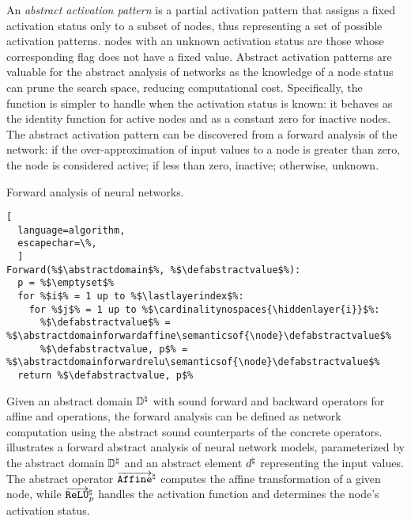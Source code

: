 An \emph{abstract activation pattern} is a partial activation pattern that assigns a fixed activation status only to a subset of \relu{} nodes, thus representing a set of possible activation patterns. \relu{} nodes with an unknown activation status are those whose corresponding flag does not have a fixed value. Abstract activation patterns are valuable for the abstract analysis of networks as the knowledge of a node status can prune the search space, reducing computational cost. Specifically, the \relu{} function is simpler to handle when the activation status is known: it behaves as the identity function for active nodes and as a constant zero for inactive nodes. The abstract activation pattern can be discovered from a forward analysis of the network: if the over-approximation of input values to a node is greater than zero, the node is considered active; if less than zero, inactive; otherwise, unknown.


\begin{marginlisting}
  \caption{Forward analysis of neural networks.}
\vspace{0.8cm}
\begin{lstlisting}[
  language=algorithm,
  escapechar=\%,
  ]
Forward(%$\abstractdomain$%, %$\defabstractvalue$%):
  p = %$\emptyset$%
  for %$i$% = 1 up to %$\lastlayerindex$%:
    for %$j$% = 1 up to %$\cardinalitynospaces{\hiddenlayer{i}}$%:
      %$\defabstractvalue$% = %$\abstractdomainforwardaffine\semanticsof{\node}\defabstractvalue$%
      %$\defabstractvalue, p$% = %$\abstractdomainforwardrelu\semanticsof{\node}\defabstractvalue$%
  return %$\defabstractvalue, p$%
\end{lstlisting}
\end{marginlisting}


Given an abstract domain $\mathbb{D}^\natural$ with sound forward and backward operators for affine and \relu{} operations, the forward analysis can be defined as network computation using the abstract sound counterparts of the concrete operators.  illustrates a forward abstract analysis of neural network models, parameterized by the abstract domain $\mathbb{D}^\natural$ and an abstract element $d^\natural$ representing the input values. The abstract operator $\overrightarrow{\textup{\texttt{Affine}}}^\natural$ computes the affine transformation of a given node, while $\overrightarrow{\textup{\texttt{ReLU}}}^\natural_p$ handles the \relu{} activation function and determines the node's activation status.

